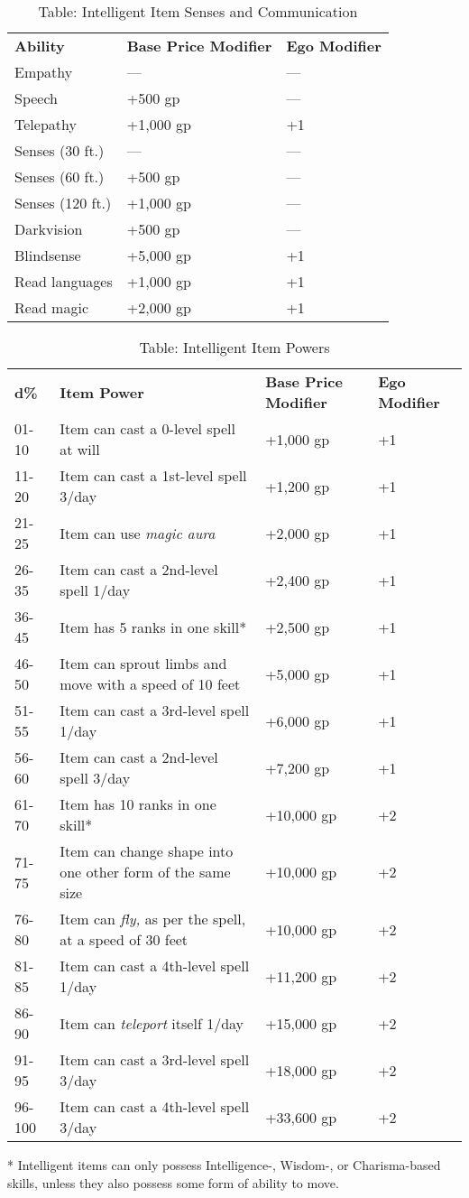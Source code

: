 \begin{table}[]
\sffamily
\caption{Table: Intelligent Item Senses and Communication}
\begin{tabular}{lll}
\textbf{Ability} & \textbf{Base Price Modifier} & \textbf{Ego Modifier}\\
Empathy & --- & --- \\
Speech & +500 gp & --- \\
Telepathy & +1,000 gp & +1 \\
Senses (30 ft.) & --- & --- \\
Senses (60 ft.) & +500 gp & --- \\
Senses (120 ft.) & +1,000 gp & --- \\
Darkvision & +500 gp & --- \\
Blindsense & +5,000 gp & +1 \\
Read languages & +1,000 gp & +1\\
Read magic  & +2,000 gp & +1\\
\end{tabular}
\end{table}
\begin{table}[]
\sffamily
\caption{Table: Intelligent Item Powers}
\begin{tabular}{llll}
\textbf{d\%} & \textbf{Item Power} & \textbf{Base Price Modifier} & \textbf{Ego Modifier}\\
01-10 & Item can cast a 0-level spell at will & +1,000 gp & +1 \\
 11-20 & Item can cast a 1st-level spell 3/day & +1,200 gp & +1 \\
 21-25 & Item can use \textit{magic aura} & +2,000 gp & +1 \\
 26-35 & Item can cast a 2nd-level spell 1/day & +2,400 gp & +1 \\
 36-45 & Item has 5 ranks in one skill* & +2,500 gp & +1 \\
 46-50 & Item can sprout limbs and move with a speed of 10 feet & +5,000 gp & +1 \\
 51-55 & Item can cast a 3rd-level spell 1/day & +6,000 gp & +1 \\
 56-60 & Item can cast a 2nd-level spell 3/day & +7,200 gp & +1 \\
 61-70 & Item has 10 ranks in one skill* & +10,000 gp & +2 \\
 71-75 & Item can change shape into one other form of the same size & +10,000 gp & +2 \\
 76-80 & Item can \textit{fly, }as per the spell, at a speed of 30 feet & +10,000 gp & +2 \\
 81-85 & Item can cast a 4th-level spell 1/day & +11,200 gp & +2 \\
 86-90 & Item can \textit{teleport} itself 1/day & +15,000 gp & +2 \\
 91-95 & Item can cast a 3rd-level spell 3/day & +18,000 gp & +2 \\
 96-100 & Item can cast a 4th-level spell 3/day & +33,600 gp & +2\\
\end{tabular}
* Intelligent items can only possess Intelligence-, Wisdom-, or Charisma-based skills, unless they also possess some form of ability to move.
\end{table}
